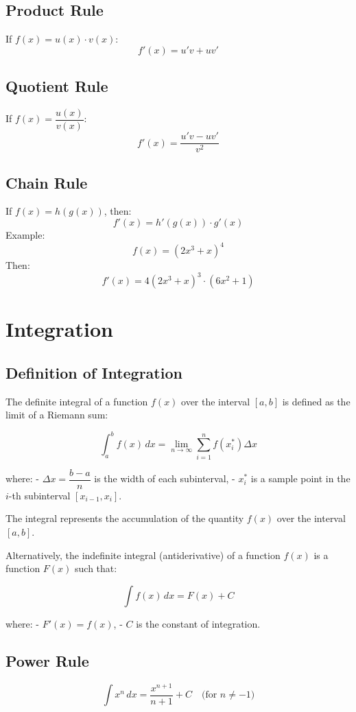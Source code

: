 \documentclass{article}
\begin{document}
\begin{multicols}{2}
\subsection*{Product Rule}
If \( f(x) = u(x) \cdot v(x) \):
\[
f'(x) = u'v + uv'
\]

\subsection*{Quotient Rule}
If \( f(x) = \dfrac{u(x)}{v(x)} \):
\[
f'(x) = \frac{u'v - uv'}{v^2}
\]

\subsection*{Chain Rule}
If \( f(x) = h(g(x)) \), then:
\[
f'(x) = h'(g(x)) \cdot g'(x)
\]
Example:
\[
f(x) = (2x^3 + x)^4
\]
Then:
\[
f'(x) = 4(2x^3 + x)^3 \cdot (6x^2 + 1)
\]

\columnbreak

\section*{Integration}
\subsection*{Definition of Integration}

The definite integral of a function \( f(x) \) over the interval \([a, b]\) is defined as the limit of a Riemann sum:

\[
\int_{a}^{b} f(x) \, dx = \lim_{n \to \infty} \sum_{i=1}^{n} f(x_i^*) \Delta x
\]

where:
- \( \Delta x = \dfrac{b - a}{n} \) is the width of each subinterval,
- \( x_i^* \) is a sample point in the \( i \)-th subinterval \([x_{i-1}, x_i]\).

The integral represents the accumulation of the quantity \( f(x) \) over the interval \([a, b]\).

Alternatively, the indefinite integral (antiderivative) of a function \( f(x) \) is a function \( F(x) \) such that:

\[
\int f(x) \, dx = F(x) + C
\]

where:
- \( F'(x) = f(x) \),
- \( C \) is the constant of integration.

\subsection*{Power Rule}
\[
\int x^n \, dx = \frac{x^{n+1}}{n+1} + C \quad \text{(for } n \neq -1\text{)}
\]


\end{multicols}
\end{document}

